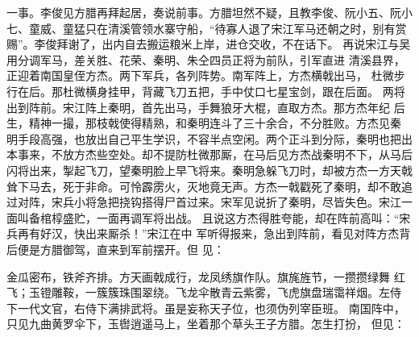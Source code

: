 一事。李俊见方腊再拜起居，奏说前事。方腊坦然不疑，且教李俊、阮小五、阮小
七、童威、童猛只在清溪管领水寨守船，“待寡人退了宋江军马还朝之时，别有赏
赐”。李俊拜谢了，出内自去搬运粮米上岸，进仓交收，不在话下。
再说宋江与吴用分调军马，差关胜、花荣、秦明、朱仝四员正将为前队，引军直进
清溪县界，正迎着南国皇侄方杰。两下军兵，各列阵势。南军阵上，方杰横戟出马，
杜微步行在后。那杜微横身挂甲，背藏飞刀五把，手中仗口七星宝剑，跟在后面。
两将出到阵前。宋江阵上秦明，首先出马，手舞狼牙大棍，直取方杰。那方杰年纪
后生，精神一撮，那枝戟使得精熟，和秦明连斗了三十余合，不分胜败。方杰见秦
明手段高强，也放出自己平生学识，不容半点空闲。两个正斗到分际，秦明也把出
本事来，不放方杰些空处。却不提防杜微那厮，在马后见方杰战秦明不下，从马后
闪将出来，掣起飞刀，望秦明脸上早飞将来。秦明急躲飞刀时，却被方杰一方天戟
耸下马去，死于非命。可怜霹雳火，灭地竟无声。方杰一戟戳死了秦明，却不敢追
过对阵，宋兵小将急把挠钩搭得尸首过来。宋军见说折了秦明，尽皆失色。宋江一
面叫备棺椁盛贮，一面再调军将出战。
且说这方杰得胜夸能，却在阵前高叫：“宋兵再有好汉，快出来厮杀！”宋江在中
军听得报来，急出到阵前，看见对阵方杰背后便是方腊御驾，直来到军前摆开。但
见：

金瓜密布，铁斧齐排。方天画戟成行，龙凤绣旗作队。旗旄旌节，一攒攒绿舞
红飞；玉镫雕鞍，一簇簇珠围翠绕。飞龙伞散青云紫雾，飞虎旗盘瑞霭祥烟。左侍
下一代文官，右侍下满排武将。虽是妄称天子位，也须伪列宰臣班。
南国阵中，只见九曲黄罗伞下，玉辔逍遥马上，坐着那个草头王子方腊。怎生打扮，
但见：

